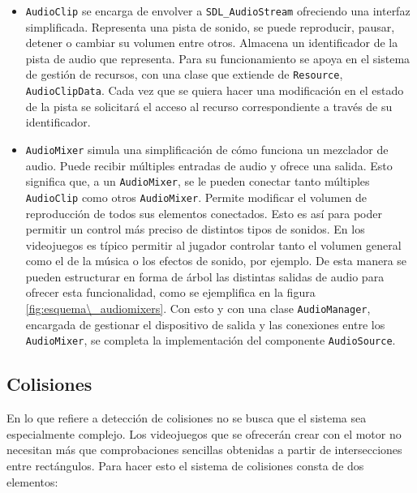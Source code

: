 \begin{itemize}
	\item \texttt{AudioClip} se encarga de envolver a \texttt{SDL\_AudioStream} ofreciendo una interfaz simplificada. Representa una pista de sonido, se puede reproducir, pausar, detener o cambiar su volumen entre otros. Almacena un identificador de la pista de audio que representa. Para su funcionamiento se apoya en el sistema de gestión de recursos, con una clase que extiende de \texttt{Resource}, \texttt{AudioClipData}. Cada vez que se quiera hacer una modificación en el estado de la pista se solicitará el acceso al recurso correspondiente a través de su identificador.
	\item \texttt{AudioMixer} simula una simplificación de cómo funciona un mezclador de audio. Puede recibir múltiples entradas de audio y ofrece una salida. Esto significa que, a un \texttt{AudioMixer}, se le pueden conectar tanto múltiples \texttt{AudioClip} como otros \texttt{AudioMixer}. Permite modificar el volumen de reproducción de todos sus elementos conectados. Esto es así para poder permitir un control más preciso de distintos tipos de sonidos. En los videojuegos es típico permitir al jugador controlar tanto el volumen general como el de la música o los efectos de sonido, por ejemplo. De esta manera se pueden estructurar en forma de árbol las distintas salidas de audio para ofrecer esta funcionalidad, como se ejemplifica en la figura \ref{fig:esquema\_audiomixers}. Con esto y con una clase \texttt{AudioManager}, encargada de gestionar el dispositivo de salida y las conexiones entre los \texttt{AudioMixer}, se completa la implementación del componente \texttt{AudioSource}.
\end{itemize}


\subsection{Colisiones}
En lo que refiere a detección de colisiones no se busca que el sistema sea especialmente complejo. Los videojuegos que se ofrecerán crear con el motor no necesitan más que comprobaciones sencillas obtenidas a partir de intersecciones entre rectángulos. Para hacer esto el sistema de colisiones consta de dos elementos: 

